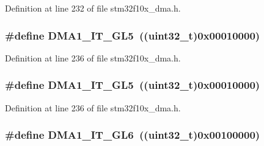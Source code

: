 Definition at line 232 of file stm32f10x\+\_\+dma.\+h.

\subsubsection[{\texorpdfstring{D\+M\+A1\+\_\+\+I\+T\+\_\+\+G\+L5}{DMA1_IT_GL5}}]{\setlength{\rightskip}{0pt plus 5cm}\#define D\+M\+A1\+\_\+\+I\+T\+\_\+\+G\+L5~(({\bf uint32\+\_\+t})0x00010000)}\hypertarget{group___d_m_a__interrupts__definition_ga6a8d925c490ea6e7eaf9fbceea9774f6}{}\label{group___d_m_a__interrupts__definition_ga6a8d925c490ea6e7eaf9fbceea9774f6}


Definition at line 236 of file stm32f10x\+\_\+dma.\+h.

\subsubsection[{\texorpdfstring{D\+M\+A1\+\_\+\+I\+T\+\_\+\+G\+L5}{DMA1_IT_GL5}}]{\setlength{\rightskip}{0pt plus 5cm}\#define D\+M\+A1\+\_\+\+I\+T\+\_\+\+G\+L5~(({\bf uint32\+\_\+t})0x00010000)}\hypertarget{group___d_m_a__interrupts__definition_ga6a8d925c490ea6e7eaf9fbceea9774f6}{}\label{group___d_m_a__interrupts__definition_ga6a8d925c490ea6e7eaf9fbceea9774f6}


Definition at line 236 of file stm32f10x\+\_\+dma.\+h.

\subsubsection[{\texorpdfstring{D\+M\+A1\+\_\+\+I\+T\+\_\+\+G\+L6}{DMA1_IT_GL6}}]{\setlength{\rightskip}{0pt plus 5cm}\#define D\+M\+A1\+\_\+\+I\+T\+\_\+\+G\+L6~(({\bf uint32\+\_\+t})0x00100000)}\hypertarget{group___d_m_a__interrupts__definition_ga623e986da940dbdbc4155f0c1fc4eae8}{}\label{group___d_m_a__interrupts__definition_ga623e986da940dbdbc4155f0c1fc4eae8}


